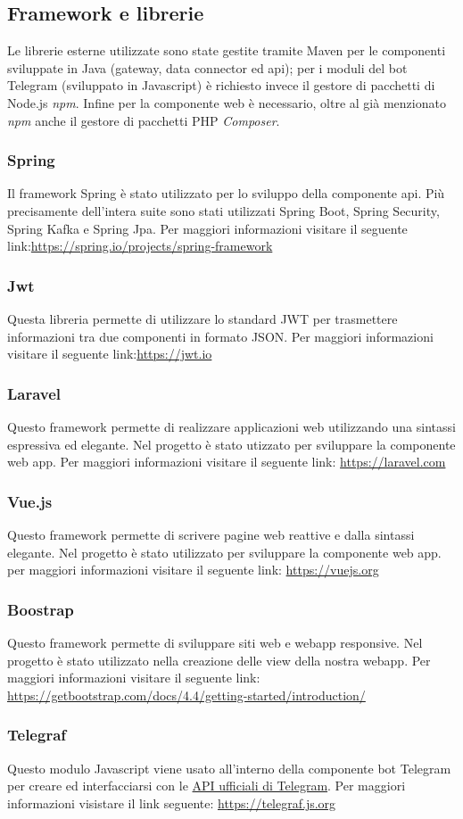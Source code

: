 	\subsection{Framework e librerie}
		Le librerie esterne utilizzate sono state gestite tramite Maven per le componenti sviluppate in Java (gateway, data connector ed api); per i moduli del bot Telegram (sviluppato in Javascript) è richiesto invece il gestore di pacchetti di Node.js \textit{npm}. Infine per la componente web è necessario, oltre al già menzionato \textit{npm} anche il gestore di pacchetti PHP \textit{Composer}.
		\subsubsection{Spring}
			Il framework Spring è stato utilizzato per lo sviluppo della componente api. Più precisamente dell'intera suite sono stati utilizzati Spring Boot, Spring Security, Spring Kafka e Spring Jpa. Per maggiori informazioni visitare il seguente link:\url{https://spring.io/projects/spring-framework}
		\subsubsection{Jwt}
			Questa libreria permette di utilizzare lo standard JWT per trasmettere informazioni tra due componenti in formato JSON. Per maggiori informazioni visitare il seguente link:\url{https://jwt.io}
		\subsubsection{Laravel}
			Questo framework permette di realizzare applicazioni web utilizzando una sintassi espressiva ed elegante. Nel progetto è stato utizzato per sviluppare la componente web app. Per maggiori informazioni visitare il seguente link: \url{https://laravel.com}
		\subsubsection{Vue.js}
			Questo framework permette di scrivere pagine web reattive e dalla sintassi elegante. Nel progetto è stato utilizzato per sviluppare la componente web app. per maggiori informazioni visitare il seguente link: \url{https://vuejs.org}
		\subsubsection{Boostrap}
			Questo framework permette di sviluppare siti web e webapp responsive. Nel progetto è stato utilizzato nella creazione delle view della nostra webapp.
			Per maggiori informazioni visitare il seguente link: \url{https://getbootstrap.com/docs/4.4/getting-started/introduction/}	
		\subsubsection{Telegraf}
			Questo modulo Javascript viene usato all'interno della componente bot Telegram per creare ed interfacciarsi con le \href{https://core.telegram.org/bots/api}{API ufficiali di Telegram}. Per maggiori informazioni visistare il link seguente: \url{https://telegraf.js.org} 
	